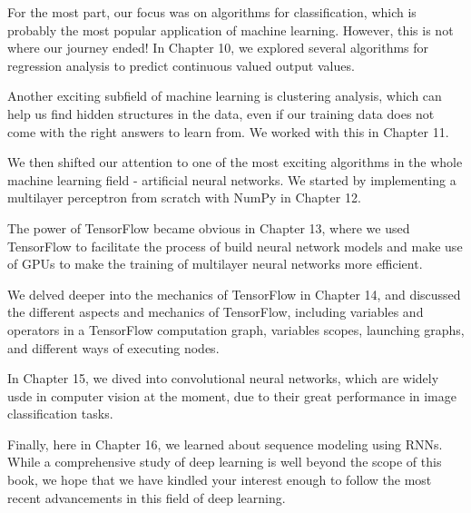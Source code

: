 \documentclass[11pt]{article}
\begin{document}
For the most part, our focus was on algorithms for classification, which
is probably the most popular application of machine learning. However,
this is not where our journey ended! In Chapter 10, we explored several
algorithms for regression analysis to predict continuous valued output
values.

Another exciting subfield of machine learning is clustering analysis,
which can help us find hidden structures in the data, even if our
training data does not come with the right answers to learn from. We
worked with this in Chapter 11.

We then shifted our attention to one of the most exciting algorithms in
the whole machine learning field - artificial neural networks. We
started by implementing a multilayer perceptron from scratch with NumPy
in Chapter 12.

The power of TensorFlow became obvious in Chapter 13, where we used
TensorFlow to facilitate the process of build neural network models and
make use of GPUs to make the training of multilayer neural networks more
efficient.

We delved deeper into the mechanics of TensorFlow in Chapter 14, and
discussed the different aspects and mechanics of TensorFlow, including
variables and operators in a TensorFlow computation graph, variables
scopes, launching graphs, and different ways of executing nodes.

In Chapter 15, we dived into convolutional neural networks, which are
widely usde in computer vision at the moment, due to their great
performance in image classification tasks.

Finally, here in Chapter 16, we learned about sequence modeling using
RNNs. While a comprehensive study of deep learning is well beyond the
scope of this book, we hope that we have kindled your interest enough to
follow the most recent advancements in this field of deep learning.


    
    
    
    
\end{document}
